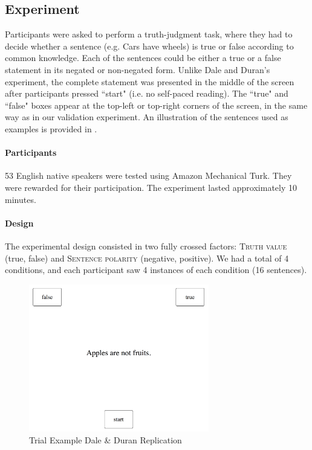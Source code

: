 \documentclass{article}
\begin{document}


\subsection{Experiment}
Participants were asked to perform a truth-judgment task, where they had to decide whether a sentence (e.g. Cars have wheels) is true or false according to common knowledge. Each of the sentences could be either a true or a false statement in its negated or non-negated form. 
Unlike Dale and Duran's experiment, the complete statement was presented in the middle of the screen after participants pressed ``start" (i.e. no self-paced reading). The ``true" and ``false"  boxes appear at the top-left or top-right corners of the screen, in the same way as in our validation experiment.  
An illustration of the sentences used as examples is provided in . 

\paragraph{Participants}
53 English native speakers were tested using Amazon Mechanical Turk. They were rewarded for their participation. The experiment lasted approximately 10 minutes. 

\paragraph{Design}
The experimental design consisted in two fully crossed factors: \textsc{Truth value} (true, false) and \textsc{Sentence polarity} (negative, positive). We had a total of 4 conditions, and each participant saw 4 instances of each condition (16 sentences). 


\begin{figure}
\centering
\includegraphics[width=0.7\textwidth]{trial_example2.png}
\caption{Trial Example Dale \& Duran Replication}
\end{figure}
\end{document}
